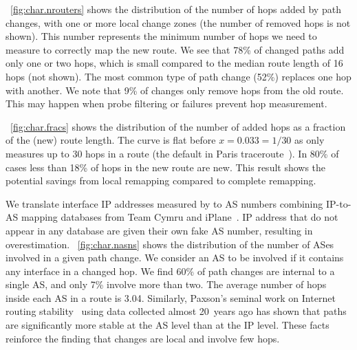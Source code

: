 

\figstr~\ref{fig:char.nrouters} shows the distribution of the number of hops
added by path changes, with one or more local change zones (the number of
removed hops is not shown).  This number represents the minimum number of hops
we need to measure to correctly map the new route.  We see that 78\% of
changed paths add only one or two hops, which is small compared to the median
route length of 16 hops (not shown).  The most common type of path change
(52\%) replaces one hop with another.  We note that 9\% of changes only remove
hops from the old route. This may happen when probe filtering or failures
prevent hop measurement.




\figstr~\ref{fig:char.fracs} shows the distribution of the number of
added hops as a fraction of the (new) route length.  The curve is flat
before $x = 0.033 = 1/30$ as \dtrack{} only measures up to 30 hops in a
route (the default in Paris traceroute~\cite{veitch09balancer}).  In
80\% of cases less than 18\% of hops in the new route are new.  This
result shows the potential savings from local remapping compared to
complete remapping.

We translate interface IP addresses measured by \dtrack{} to AS
numbers combining IP-to-AS mapping databases from Team
Cymru\footnotemark{} and iPlane~\cite{madhyastha06iplane}.  IP address
that do not appear in any database are given their own fake AS number,
resulting in overestimation.  \figstr~\ref{fig:char.nasns} shows the
distribution of the number of ASes involved in a given path change.  We
consider an AS to be involved if it contains any interface in a changed
hop.  We find 60\% of path changes are internal to a single AS, and only
7\% involve more than two.  The average number of hops inside each AS in
a route is 3.04.  Similarly, Paxson's seminal work on Internet routing
stability~\cite{paxson97routing} using data collected almost 20~years
ago has shown that paths are significantly more stable at the AS level
than at the IP level.  These facts reinforce the finding that changes
are local and involve few hops.

